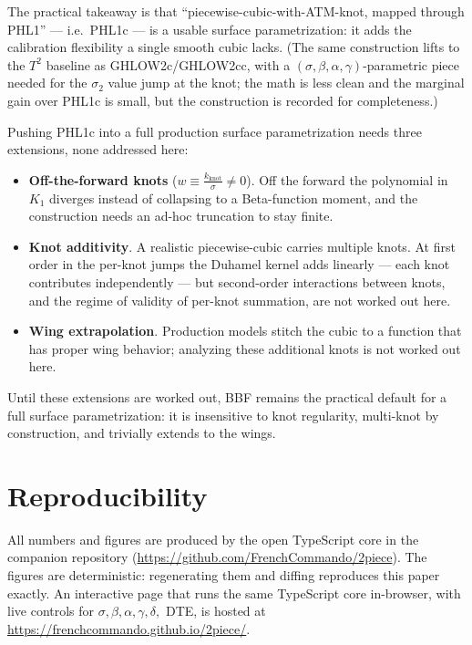 \documentclass[11pt]{article}
\begin{document}
The practical takeaway is that
``piecewise-cubic-with-ATM-knot, mapped through PHL1'' --- i.e.\
PHL1c --- is a usable surface parametrization: it adds the
calibration flexibility a single smooth cubic lacks. (The same
construction lifts to the $T^{2}$ baseline as GHLOW2c/GHLOW2cc, with
a $(\sigma,\beta,\alpha,\gamma)$-parametric piece needed for the
$\sigma_2$ value jump at the knot; the math is less clean and the
marginal gain over PHL1c is small, but the construction is recorded
for completeness.)

Pushing PHL1c into a full production surface parametrization needs
three extensions, none addressed here:
\begin{itemize}
\item \textbf{Off-the-forward knots} ($w \equiv \frac{k_{\mathrm{knot}}}{\sigma}
\neq 0$). Off the forward the polynomial in $K_1$ diverges instead of
collapsing to a Beta-function moment, and the construction needs an
ad-hoc truncation to stay finite.
\item \textbf{Knot additivity}. A realistic piecewise-cubic carries
multiple knots. At first order in the per-knot jumps the Duhamel
kernel adds linearly --- each knot contributes independently --- but
second-order interactions between knots, and the regime of validity
of per-knot summation, are not worked out here.
\item \textbf{Wing extrapolation}. Production models stitch the
cubic to a function that has proper wing behavior; analyzing these
additional knots is not worked out here.
\end{itemize}

Until these extensions are worked out, BBF remains the practical
default for a full surface parametrization: it is insensitive to
knot regularity, multi-knot by construction, and trivially extends
to the wings.

\section{Reproducibility}

All numbers and figures are produced by the open TypeScript core in the
companion repository
(\url{https://github.com/FrenchCommando/2piece}). 
The figures are deterministic: regenerating
them and diffing reproduces this paper exactly. An interactive page
that runs the same TypeScript core in-browser, with live controls for
$\sigma,\beta,\alpha,\gamma,\delta,$ DTE, is hosted at
\url{https://frenchcommando.github.io/2piece/}.
\end{document}
